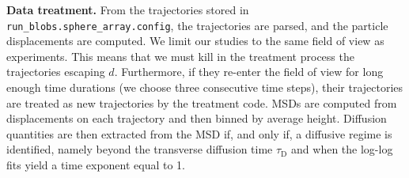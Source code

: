 \textbf{Data treatment.} From the trajectories stored in \texttt{run\_blobs.sphere\_array.config}, the trajectories are parsed, and the particle displacements are computed. We limit our studies to the same field of view as experiments. This means that we must kill in the treatment process the trajectories escaping $d$. Furthermore, if they re-enter the field of view for long enough time durations (we choose three consecutive time steps), their trajectories are treated as new trajectories by the treatment code. MSDs are computed from displacements on each trajectory and then binned by average height. Diffusion quantities are then extracted from the MSD if, and only if, a diffusive regime is identified, namely beyond the transverse diffusion time $\tau_\mathrm{D}$ and when the log-log fits yield a time exponent equal to 1.


